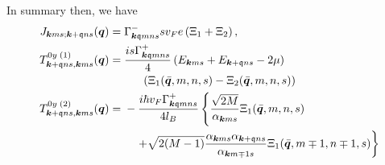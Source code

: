 In summary then, we have
\begin{align}
  J_{\vec{k} ms; \vec{k} + \qvec{q} ns}( \vec{q}) &=
                                                   \Gamma ^{-}_{\vec{k} \qvec{q} m n s}
                                                   sv_F e
                                                   \left( \Xi _1 + \Xi _2 \right),\\
  T^{0y\; (1)}_{\vec{k}+\qvec{q}ns, \vec{k}ms}(\vec{q}) &=
                                                         \begin{multlined}[t]
                                                           \frac{is \Gamma^{+} _{\vec{k} \qvec{q} m n s}}{4}
                                                           \left( E_{\vec{k} ms} + E_{\vec{k} + \qvec{q} ns} - 2\mu  \right)\\
                                                           \left( \Xi_1(\bar{\vec{q}}, m, n, s) - \Xi_2(\bar{\vec{q}}, m, n, s)  \right)
                                                         \end{multlined}\\
  T^{0y\; (2)}_{\vec{k}+\qvec{q}ns, \vec{k}ms}(\vec{q}) &=
                                                         \begin{multlined}[t]
                                                           - \frac{i \hbar v_{F} \Gamma^{+} _{\vec{k} \qvec{q} m n s}}{4 l_B}
                                                           \left\{
                                                             \frac{\sqrt{2M}}{\alpha _{\vec{k} m s} }
                                                             \Xi_1(\bar{\vec{q}}, m, n, s)
                                                             \right.\\
                                                             \left.+
                                                             \sqrt{2(M-1)}
                                                             \frac{\alpha _{\vec{k} m s} \alpha _{\vec{k} + \qvec{q} n s}}{\alpha _{\vec{k} m\mp 1 s}}
                                                             \Xi_1(\bar{\vec{q}}, m\mp 1, n \mp 1, s)
                                                           \right\}
                                                         \end{multlined}\\

\end{align}

